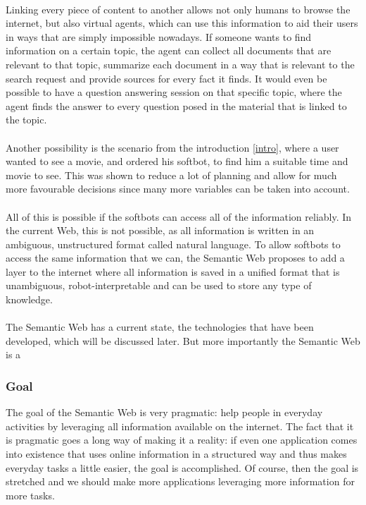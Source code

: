 \documentclass{article}
\begin{document}
 \paragraph{}
 Linking every piece of content to another allows not only humans to browse the internet, but also virtual agents, which can use this information to aid their users in ways that are simply impossible nowadays. If someone wants to find information on a certain topic, the agent can collect all documents that are relevant to that topic, summarize each document in a way that is relevant to the search request and provide sources for every fact it finds. It would even be possible to have a question answering session on that specific topic, where the agent finds the answer to every question posed in the material that is linked to the topic.
 \paragraph{}
 Another possibility is the scenario from the introduction \ref{intro}, where a user wanted to see a movie, and ordered his softbot, to find him a suitable time and movie to see. This was shown to reduce a lot of planning and allow for much more favourable decisions since many more variables can be taken into account.
 \paragraph{}
 All of this is possible if the softbots can access all of the information reliably. In the current Web, this is not possible, as all information is written in an ambiguous, unstructured format called natural language. To allow softbots to access the same information that we can, the Semantic Web proposes to add a layer to the internet where all information is saved in a unified format that is unambiguous, robot-interpretable and can be used to store any type of knowledge.
 \paragraph{}
 The Semantic Web has a current state, the technologies that have been developed, which will be discussed later. But more importantly the Semantic Web is a 
 
 \subsubsection{Goal}
 The goal of the Semantic Web is very pragmatic: help people in everyday activities by leveraging all information available on the internet. The fact that it is pragmatic goes a long way of making it a reality: if even one application comes into existence that uses online information in a structured way and thus makes everyday tasks a little easier, the goal is accomplished. Of course, then the goal is stretched and we should make more applications leveraging more information for more tasks.
\end{document}
